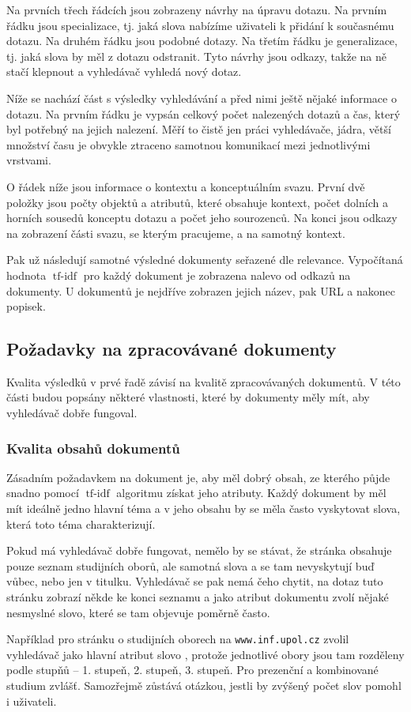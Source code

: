 \documentclass[12pt]{article}
\newcommand{\code}[1]{\texttt{#1}}
\newcommand{\ssection}[1]{\subsection{#1}}
\newcommand{\sssection}[1]{\subsubsection{#1}}
\DeclareMathOperator{\tfidf}{tf-idf}
\begin{document}
Na prvních třech řádcích jsou zobrazeny návrhy na úpravu dotazu. Na prvním řádku jsou specializace, tj. jaká slova nabízíme uživateli k přidání k současnému dotazu. Na druhém řádku jsou podobné dotazy. Na třetím řádku je generalizace, tj. jaká slova by měl z dotazu odstranit. Tyto návrhy jsou odkazy, takže na ně stačí klepnout a vyhledávač vyhledá nový dotaz. 

Níže se nachází část s výsledky vyhledávání a před nimi ještě nějaké informace o dotazu. Na prvním řádku je vypsán celkový počet nalezených dotazů a čas, který byl potřebný na jejich nalezení. Měří to čistě jen práci vyhledávače, jádra, větší množství času je obvykle ztraceno samotnou komunikací mezi jednotlivými vrstvami. 

O řádek níže jsou informace o kontextu a konceptuálním svazu. První dvě položky jsou počty objektů a atributů, které obsahuje kontext, počet dolních a horních sousedů konceptu dotazu a počet jeho sourozenců. Na konci jsou odkazy na zobrazení části svazu, se kterým pracujeme, a na samotný kontext.

Pak už následují samotné výsledné dokumenty seřazené dle relevance. Vypočítaná hodnota $\tfidf$ pro každý dokument je zobrazena nalevo od odkazů na dokumenty. U dokumentů je nejdříve zobrazen jejich název, pak URL a nakonec popisek. 

\ssection{Požadavky na zpracovávané dokumenty}
Kvalita výsledků v prvé řadě závisí na kvalitě zpracovávaných dokumentů. V této části budou popsány některé vlastnosti, které by dokumenty měly mít, aby vyhledávač dobře fungoval. 

\sssection{Kvalita obsahů dokumentů}\label{ch.kvalita}
Zásadním požadavkem na dokument je, aby měl dobrý obsah, ze kterého půjde snadno pomocí $\tfidf$ algoritmu získat jeho atributy. Každý dokument by měl mít ideálně jedno hlavní téma a v jeho obsahu by se měla často vyskytovat slova, která toto téma charakterizují. 

Pokud má vyhledávač dobře fungovat, nemělo by se stávat, že stránka  obsahuje pouze seznam studijních oborů, ale samotná slova  a  se tam nevyskytují buď vůbec, nebo jen v titulku. Vyhledávač se pak nemá čeho chytit, na dotaz  tuto stránku zobrazí někde ke konci seznamu a jako atribut dokumentu zvolí nějaké nesmyslné slovo, které se tam objevuje poměrně často. 

Například pro stránku o studijních oborech na \code{www.inf.upol.cz} zvolil vyhledávač jako hlavní atribut slovo , protože jednotlivé obory jsou tam rozděleny podle stupňů -- 1. stupeň, 2. stupeň, 3. stupeň. Pro prezenční a kombinované studium zvlášť. Samozřejmě zůstává otázkou, jestli by zvýšený počet slov  pomohl i uživateli. 
\end{document}
